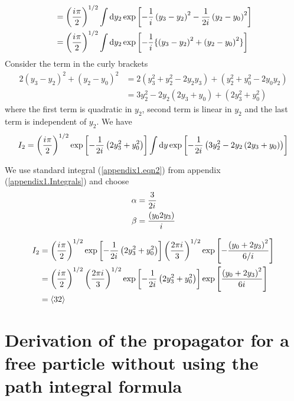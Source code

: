 \begin{enumerate}
\begin{align*}
		&= \left(\frac{{i\mkern1mu} \pi}{2}\right)^{1/2} \int \dd{y_2} \exp \left[-\frac{1}{{i\mkern1mu}} \left(y_3 - y_2\right)^2 -\frac{1}{2 {i\mkern1mu}} \left(y_2 - y_0\right)^2\right] \\
		&= \left(\frac{{i\mkern1mu} \pi}{2}\right)^{1/2} \int \dd{y_2} \exp \left[-\frac{1}{{i\mkern1mu}} \{\left(y_3 - y_2\right)^2 + \left(y_2 - y_0\right)^2\}\right] \\
	\end{align*}
	Consider the term in the curly brackets
	\begin{align*}
		2\left(y_3 - y_2\right)^2 + \left(y_2 - y_0\right)^2 &= 2\left(y_3^2 + y_2^2 - 2y_2 y_3\right) + \left(y_2^2 + y_0^2 - 2 y_0 y_2\right) \\
		&= 3 y_2^2 - 2y_2 \left(2y_3 + y_0\right) + \left(2 y_3^2 + y_0^2\right)
	\end{align*}
	where the first term is quadratic in $y_2$, second term is linear in $y_2$ and the last term is independent of $y_2$. We have
	\begin{equation}
		I_2 = \left(\frac{{i\mkern1mu} \pi}{2}\right)^{1/2} \exp\left[-\frac{1}{2{i\mkern1mu}}\left(2 y_3^2 + y_0^2\right)\right] \int \dd{y} \exp\left[-\frac{1}{2{i\mkern1mu}} \left(3 y_2^2 - 2y_2 \left(2 y_3 + y_0\right)\right) \right]
	\end{equation}
	
	We use standard integral (\ref{appendix1.eqn2}) from appendix (\ref{appendix1.Integrals}) and choose
	\begin{align}
		\alpha &= \frac{3}{2{i\mkern1mu}} \\
		\beta &= \frac{\left(y_0 2 y_3\right)}{{i\mkern1mu}}
	\end{align}
	
	\begin{align}
		I_2 
		&= \left(\frac{{i\mkern1mu} \pi}{2}\right)^{1/2} \exp\left[-\frac{1}{2{i\mkern1mu}} \left(2 y_3^2 + y_0^2\right)\right] \left(\frac{2\pi {i\mkern1mu}}{3}\right)^{1/2} \exp\left[-\frac{\left(y_0 + 2 y_3\right)^2}{6/{i\mkern1mu}}\right] \\
		&= \left(\frac{{i\mkern1mu} \pi}{2}\right)^{1/2} \left(\frac{2\pi {i\mkern1mu}}{3}\right)^{1/2}  \exp\left[-\frac{1}{2{i\mkern1mu}} \left(2 y_3^2 + y_0^2\right)\right]  \exp\left[\frac{\left(y_0 + 2 y_3\right)^2}{6{i\mkern1mu}}\right] \\
		&= \expval{32}
	\end{align}
	
	\section{Derivation of the propagator for a free particle without using the path integral formula}

\end{enumerate}